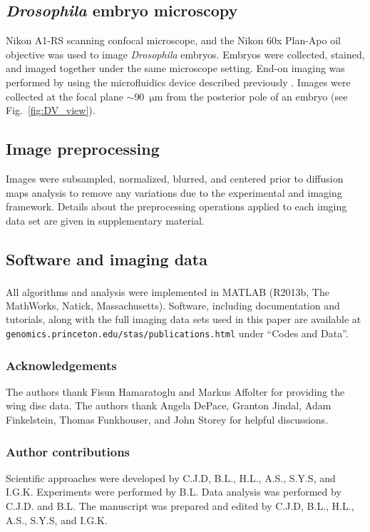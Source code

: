 \documentclass[twocolumn, 10pt]{article}
\newcommand{\SI}[0]{supplementary material}
\newcommand{\fig}[0]{Fig.}
\begin{document}
\subsection*{{\em Drosophila} embryo microscopy}
%
Nikon A1-RS scanning confocal microscope, and the Nikon 60x Plan-Apo oil objective was used to image {\em Drosophila} embryos.
%
Embryos were collected, stained, and imaged together under the same microscope setting.
%
End-on imaging was performed by using the microfluidics device described previously \citep{chung2010microfluidic}.
%
Images were collected at the focal plane $\sim$90~$\mathrm{\mu m}$ from the posterior pole of an embryo (see \fig~\ref{fig:DV_view}).

\subsection*{Image preprocessing}

Images were subsampled, normalized, blurred, and centered prior to diffusion maps analysis to remove any variations due to the experimental and imaging framework.
%
Details about the preprocessing operations applied to each imging data set are given in \SI.


\subsection*{Software and imaging data}
%
All algorithms and analysis were implemented in MATLAB\textsuperscript{\textregistered} (R2013b, The MathWorks, Natick, Massachusetts).
%
Software, including documentation and tutorials, along with the full imaging data sets used in this paper are available at \texttt{genomics.princeton.edu/stas/publications.html} under ``Codes and Data''.




\subsubsection*{Acknowledgements}

The authors thank Fisun Hamaratoglu and Markus Affolter for providing the wing disc data.
%
The authors thank Angela DePace, Granton Jindal, Adam Finkelstein,  Thomas Funkhouser, and John Storey for helpful discussions.


\subsubsection*{Author contributions}
Scientific approaches were developed by C.J.D, B.L., H.L., A.S., S.Y.S, and I.G.K.
%
Experiments were performed by B.L.
%
Data analysis was performed by C.J.D. and B.L.
%
The manuscript was prepared and edited by C.J.D, B.L., H.L., A.S., S.Y.S, and I.G.K.
\end{document}
